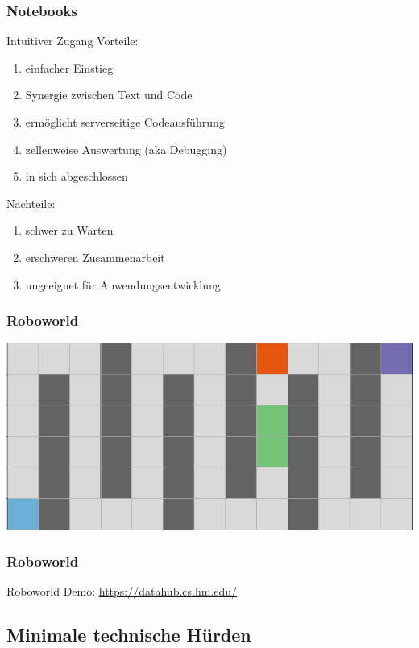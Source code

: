 \documentclass[german,aspectratio=169]{beamer}
\begin{document}
\begin{frame}
	\frametitle{Notebooks}
	\begin{block}{Intuitiver Zugang}
		Vorteile:
		\begin{enumerate}[label = $\bullet$]
			\item einfacher Einstieg
			\item Synergie zwischen Text und Code
			\item ermöglicht serverseitige Codeausführung
			\item zellenweise Auswertung (aka Debugging)
			\item in sich abgeschlossen 
		\end{enumerate}
		Nachteile:
		\begin{enumerate}[label = $\bullet$]
			\item schwer zu Warten
			\item erschweren Zusammenarbeit
			\item ungeeignet für Anwendungsentwicklung
		\end{enumerate}
	\end{block}
\end{frame}

\begin{frame}
	\frametitle{Roboworld}
	\begin{center}
		\includegraphics[width=\textwidth]{./figs/world-simple-maze}
	\end{center}
\end{frame}

\begin{frame}
	\frametitle{Roboworld}
	\begin{center}
		Roboworld Demo: \href{https://datahub.cs.hm.edu/}{https://datahub.cs.hm.edu/}
	\end{center}
\end{frame}

\subsection{Minimale technische Hürden}
\end{document}
